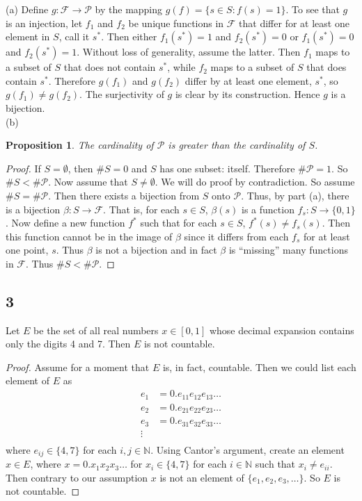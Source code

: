 \documentclass[11pt]{amsart}
\newtheorem*{prop}{Proposition}
\begin{document}
(a) Define $g: \mathcal{F} \longrightarrow \mathcal{P}$ by the mapping $g(f) = \{ s\in S : f(s) = 1\}$. To see that $g$ is an injection, let $f_{1}$ and $f_{2}$ be unique functions in $\mathcal{F}$ that differ for at least one element in $S$, call it $s^{*}$. Then either $f_{1}(s^{*}) = 1$ and $f_{2}(s^{*}) = 0$ or $f_{1}(s^{*}) = 0$ and $f_{2}(s^{*}) = 1$. Without loss of generality, assume the latter. Then $f_{1}$ maps to a subset of $S$ that does not contain $s^{*}$, while $f_{2}$ maps to a subset of $S$ that does contain $s^{*}$. Therefore $g(f_{1})$ and $g(f_{2})$ differ by at least one element, $s^{*}$, so $g(f_{1}) \neq g(f_{2})$. The surjectivity of $g$ is clear by its construction. Hence $g$ is a bijection. \\

(b)
\begin{prop}
  The cardinality of $\mathcal{P}$ is greater than the cardinality of $S$.
\end{prop}
\begin{proof}
  If $S = \emptyset$, then $\#S = 0$ and $S$ has one subset: itself. Therefore $\#\mathcal{P} = 1$. So $\#S < \#\mathcal{P}$. Now assume that $S\neq \emptyset$. We will do proof by contradiction. So assume $\#S = \#\mathcal{P}$. Then there exists a bijection from $S$ onto $\mathcal{P}$. Thus, by part (a), there is a bijection $\beta:S\longrightarrow \mathcal{F}$. That is, for each $s\in S$, $\beta(s)$ is a function $f_{s}: S\longrightarrow \{0,1\}$. Now define a new function $f^{*}$ such that for each $s\in S$, $f^{*}(s) \neq f_{s}(s)$. Then this function cannot be in the image of $\beta$ since it differs from each $f_{s}$ for at least one point, $s$. Thus $\beta$ is not a bijection and in fact $\beta$ is ``missing'' many functions in $\mathcal{F}$. Thus $\#S < \#\mathcal{P}$.
\end{proof}

\subsection*{3} Let $E$ be the set of all real numbers $x \in [0,1]$ whose decimal expansion contains only the digits 4 and 7. Then $E$ is not countable.

\begin{proof}
  Assume for a moment that $E$ is, in fact, countable. Then we could list each element of $E$ as 
  \begin{align*}
    e_{1} & = 0.e_{11}e_{12}e_{13}\hdots \\
    e_{2} & = 0.e_{21}e_{22}e_{23}\hdots \\
    e_{3} & = 0.e_{31}e_{32}e_{33}\hdots \\
    \vdots & \\
  \end{align*}
  where $e_{ij}\in \{4,7\}$ for each $i,j\in\mathbb{N}$. Using Cantor's argument, create an element $x\in E$, where $x = 0.x_{1}x_{2}x_{3}\hdots$ for $x_{i}\in \{4,7\}$ for each $i \in \mathbb{N}$ such that $x_{i}\neq e_{ii}$. Then contrary to our assumption $x$ is not an element of $\{e_{1}, e_{2}, e_{3}, \hdots\}$. So $E$ is not countable.
\end{proof}
\end{document}

